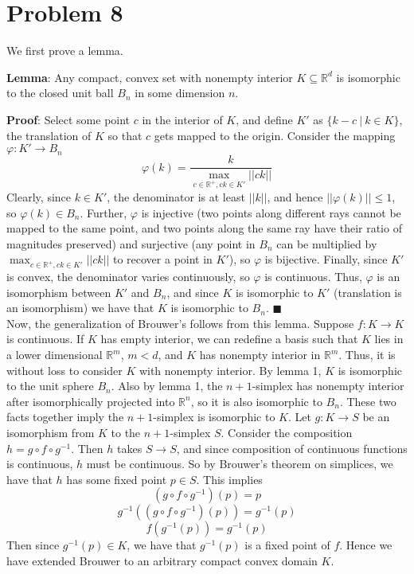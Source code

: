 \documentclass[10pt,letter]{article}
\begin{document}
\section*{Problem 8}
We first prove a lemma.

\textbf{Lemma}: Any compact, convex set with nonempty interior $K \subseteq \mathbb{R}^d$ is isomorphic to the closed unit ball $B_n$ in some dimension $n$.

\textbf{Proof}: Select some point $c$ in the interior of $K$, and define $K'$ as $\{ k - c \ | \ k \in  K \}$, the translation of $K$ so that $c$ gets mapped to the origin. Consider the mapping $\varphi: K' \to B_n$
\[ \varphi(k) = \frac{k}{\max_{c \in \mathbb{R}^+, ck \in K'} ||ck||} \] Clearly, since $k \in K'$, the denominator is at least $||k||$, and hence $||\varphi(k)|| \le 1$, so $ \varphi(k) \in B_n$. Further, $\varphi$ is injective (two points along different rays cannot be mapped to the same point, and two points along the same ray have their ratio of magnitudes preserved) and surjective (any point in $B_n$ can be multiplied by $\max_{c \in \mathbb{R}^+, ck \in K'} ||ck||$ to recover a point in $K'$), so $\varphi$ is bijective. Finally, since $K'$ is convex, the denominator varies continuously, so $\varphi$ is continuous. Thus, $\varphi$ is an isomorphism between $K'$ and $B_n$, and since $K$ is isomorphic to $K'$ (translation is an isomorphism) we have that $K$ is isomorphic to $B_n$. $\blacksquare$ \\

Now, the generalization of Brouwer's follows from this lemma. Suppose $f: K \to K$ is continuous. If $K$ has empty interior, we can redefine a basis such that $K$ lies in a lower dimensional $\mathbb{R}^m$, $m < d$, and $K$ has nonempty interior in $\mathbb{R}^m$. Thus, it is without loss to consider $K$ with nonempty interior. By lemma 1, $K$ is isomorphic to the unit sphere $B_n$. Also by lemma 1, the $n+1$-simplex has nonempty interior after isomorphically projected into $\mathbb{R}^n$, so it is also isomorphic to $B_n$. These two facts together imply the $n+1$-simplex is isomorphic to $K$. Let $g: K \to S$ be an isomorphism from $K$ to the $n+1$-simplex $S$. Consider the composition $h = g\circ f \circ g^{-1}$. Then $h$ takes $S \to S$, and since composition of continuous functions is continuous, $h$ must be continuous. So by Brouwer's theorem on simplices, we have that $h$ has some fixed point $p \in S$. This implies
\[ (g \circ f \circ g^{-1}) (p) = p \]
\[ g^{-1}((g \circ f \circ g^{-1}) (p)) = g^{-1}(p)\]
\[ f(g^{-1}(p)) = g^{-1}(p) \]
Then since $g^{-1}(p) \in K$, we have that $g^{-1}(p)$ is a fixed point of $f$. Hence we have extended Brouwer to an arbitrary compact convex domain $K$.
\end{document}
